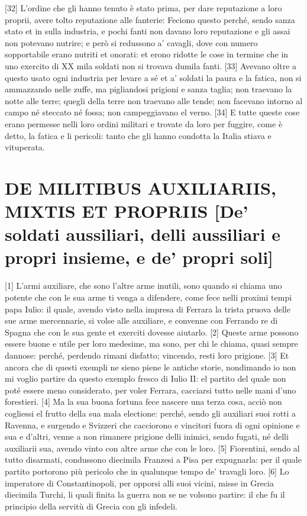 {[}32{]} L'ordine che gli hanno tenuto è stato prima, per dare
reputazione a loro proprii, avere tolto reputazione alle fanterie:
Feciono questo perché, sendo sanza stato et in sulla industria, e pochi
fanti non davano loro reputazione e gli assai non potevano nutrire; e
però si redussono a' cavagli, dove con numero sopportabile erano nutriti
et onorati: et erono ridotte le cose in termine che in uno exercito di
XX mila soldati non si trovava dumila fanti. {[}33{]} Avevano oltre a
questo usato ogni industria per levare a sé et a' soldati la paura e la
fatica, non si ammazzando nelle zuffe, ma pigliandosi prigioni e sanza
taglia; non traevano la notte alle terre; quegli della terre non
traevano alle tende; non facevano intorno al campo né steccato né fossa;
non campeggiavano el verno. {[}34{]} E tutte queste cose erano permesse
nelli loro ordini militari e trovate da loro per fuggire, come è detto,
la fatica e li pericoli: tanto che gli hanno condotta la Italia stiava e
vituperata.

\quebra\section{DE MILITIBUS AUXILIARIIS, MIXTIS ET PROPRIIS
{[}De' soldati aussiliari, delli aussiliari e propri insieme, e de' propri soli{]}}

{[}1{]} L'armi auxiliare, che sono l'altre arme inutili, sono quando si
chiama uno potente che con le sua arme ti venga a difendere, come fece
nelli proximi tempi papa Iulio: il quale, avendo visto nella impresa di
Ferrara la trista pruova delle sue arme mercennarie, si volse alle
auxiliare, e convenne con Ferrando re di Spagna che con le sua gente et
exerciti dovesse aiutarlo. {[}2{]} Queste arme possono essere buone e
utile per loro medesime, ma sono, per chi le chiama, quasi sempre
dannose: perché, perdendo rimani disfatto; vincendo, resti loro
prigione. {[}3{]} Et ancora che di questi exempli ne sieno piene le
antiche storie, nondimando io non mi voglio partire da questo exemplo
fresco di Iulio II: el partito del quale non poté essere meno
considerato, per voler Ferrara, cacciarsi tutto nelle mani d'uno
forestieri. {[}4{]} Ma la sua buona fortuna fece nascere una terza cosa,
acciò non cogliessi el frutto della sua mala electione: perché, sendo
gli auxiliari suoi rotti a Ravenna, e surgendo e Svizzeri che cacciorono
e vincitori fuora di ogni opinione e sua e d'altri, venne a non rimanere
prigione delli inimici, sendo fugati, né delli auxiliarii sua, avendo
vinto con altre arme che con le loro. {[}5{]} Fiorentini, sendo al tutto
disarmati, condussono diecimila Franzesi a Pisa per expugnarla: per il
quale partito portorono più pericolo che in qualunque tempo de' travagli
loro. {[}6{]} Lo imperatore di Constantinopoli, per opporsi alli suoi
vicini, misse in Grecia diecimila Turchi, li quali finita la guerra non
se ne volsono partire: il che fu il principio della servitù di Grecia
con gli infedeli.

